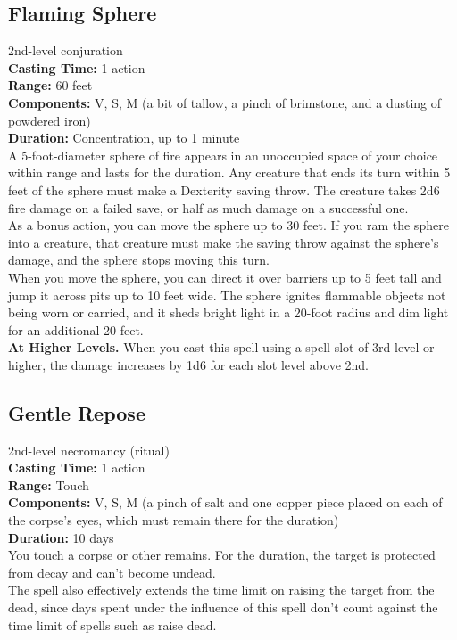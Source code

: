 \documentclass[11pt, A4paper, english]{article}
\begin{document}
		\subsection{Flaming Sphere}
2nd-level conjuration \\
\textbf{Casting Time:} 1 action \\
\textbf{Range:} 60 feet \\
\textbf{Components:} V, S, M (a bit of tallow, a pinch of brimstone, and a dusting of powdered iron) \\
\textbf{Duration:} Concentration, up to 1 minute \\
A 5-foot-diameter sphere of fire appears in an unoccupied space of your choice within range and lasts for the duration. Any creature that ends its turn within 5 feet of the sphere must make a Dexterity saving throw. The creature takes 2d6 fire damage on a failed save, or half as much damage on a successful one. \\
As a bonus action, you can move the sphere up to 30 feet. If you ram the sphere into a creature, that creature must make the saving throw against the sphere's damage, and the sphere stops moving this turn. \\
When you move the sphere, you can direct it over barriers up to 5 feet tall and jump it across pits up to 10 feet wide. The sphere ignites flammable objects not being worn or carried, and it sheds bright light in a 20-foot radius and dim light for an additional 20 feet. \\
\textbf{At Higher Levels.} When you cast this spell using a spell slot of 3rd level or higher, the damage increases by 1d6 for each slot level above 2nd.

		\subsection{Gentle Repose}
2nd-level necromancy (ritual) \\
\textbf{Casting Time:} 1 action \\
\textbf{Range:} Touch \\
\textbf{Components:} V, S, M (a pinch of salt and one copper piece placed on each of the corpse’s eyes, which must remain there for the duration) \\
\textbf{Duration:} 10 days \\
You touch a corpse or other remains. For the duration, the target is protected from decay and can't become undead. \\
The spell also effectively extends the time limit on raising the target from the dead, since days spent under the influence of this spell don’t count against the time limit of spells such as raise dead.
\end{document}
